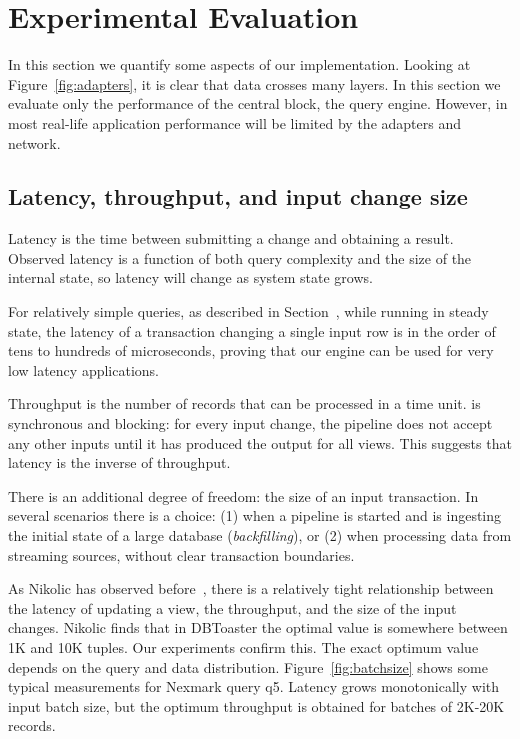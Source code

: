 \section{Experimental Evaluation}\label{sec:experiments}

\newcommand{\query}[1]{\textsf{#1}}

In this section we quantify some aspects of our implementation.
Looking at Figure~\ref{fig:adapters}, it is clear that data crosses
many layers.  In this section we evaluate only the performance of
the central block, the \dbsp query engine.  However, in most real-life
application performance will be limited by the adapters and network.

\vspace{-3ex}
\subsection{Latency, throughput, and input change size}

Latency is the time between submitting a change and obtaining a
result.  Observed latency is a function of both query complexity and
the size of the internal state, so latency will change as system
state grows.

For relatively simple queries, as described in
Section~, while running in steady state,
the latency of a transaction changing a single input row is in the
order of tens to hundreds of microseconds, proving that our engine can
be used for very low latency applications.

Throughput is the number of records that can be processed in a time
unit.  \dbsp is synchronous and blocking: for every input
change, the pipeline does not accept any other inputs until it has
produced the output for all views.  This suggests that latency is the
inverse of throughput.

There is an additional degree of freedom: the size of an input
transaction.  In several scenarios there is a choice: (1) when a
pipeline is started and is ingesting the initial state of a large
database (\emph{backfilling}), or (2) when processing data from
streaming sources, without clear transaction boundaries.

As Nikolic has observed before~\cite{nikolic-sigmod16}, there is a
relatively tight relationship between the latency of updating a view,
the throughput, and the size of the input changes.  Nikolic finds that
in DBToaster the optimal value is somewhere between 1K and 10K tuples.
Our experiments confirm this.  The exact optimum value depends on the
query and data distribution.  Figure~\ref{fig:batchsize} shows some
typical measurements for Nexmark query \query{q5}.  Latency grows
monotonically with input batch size, but the optimum throughput is
obtained for batches of 2K-20K records.

